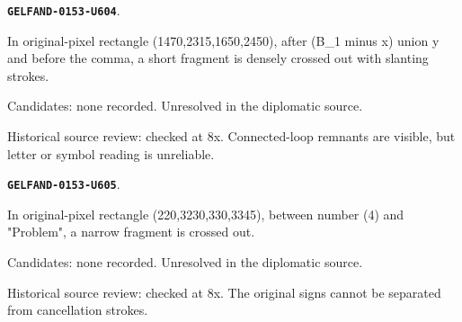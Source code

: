 \documentclass[11pt]{article}
\theoremstyle{definition}
\theoremstyle{remark}
\begin{document}
\par\noindent\leavevmode{}\label{GELFAND-0153-U604}\label{GELFAND-P001411:basis-exchange-cancelled:note}\textbf{\texttt{GELFAND-0153-U604}}.\nopagebreak[4]\par
In original-pixel rectangle (1470,2315,1650,2450), after (B\_1 minus x) union y and before the comma, a short fragment is densely crossed out with slanting strokes.\par
Candidates: none recorded. Unresolved in the diplomatic source.\par
Historical source review: checked at 8x. Connected-loop remnants are visible, but letter or symbol reading is unreliable.\par\medskip
\par\noindent\leavevmode{}\label{GELFAND-0153-U605}\label{GELFAND-P001411:problem-four-cancelled:note}\textbf{\texttt{GELFAND-0153-U605}}.\nopagebreak[4]\par
In original-pixel rectangle (220,3230,330,3345), between number (4) and "Problem", a narrow fragment is crossed out.\par
Candidates: none recorded. Unresolved in the diplomatic source.\par
Historical source review: checked at 8x. The original signs cannot be separated from cancellation strokes.\par\medskip
\end{document}
